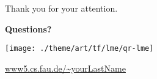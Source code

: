 \documentclass[aspectratio=43,t]{beamer}
\begin{document}
\begin{frame}{Thank you for your attention.}
	\centering
	\vspace{1cm}
		
	\textbf{\large Questions?}
	
	\vspace{0.5cm}

	\begin{center}
		\texttt{[image: ./theme/art/tf/lme/qr-lme]}
		
		\url{www5.cs.fau.de/~yourLastName}
	\end{center}
\end{frame}
\end{document}
